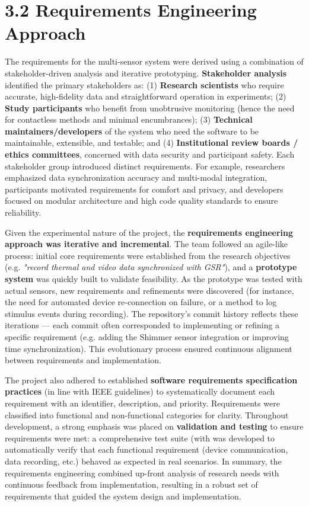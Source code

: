 \documentclass[11pt,a4paper]{report}
\begin{document}
\section{3.2 Requirements Engineering Approach}

The requirements for the multi-sensor system were derived using a
combination of stakeholder-driven analysis and iterative prototyping.
\textbf{Stakeholder analysis} identified the primary stakeholders as: (1)
\textbf{Research scientists} who require accurate, high-fidelity data and
straightforward operation in experiments; (2) \textbf{Study participants} who
benefit from unobtrusive monitoring (hence the need for contactless
methods and minimal encumbrances); (3) \textbf{Technical
maintainers/developers} of the system who need the software to be
maintainable, extensible, and testable; and (4) \textbf{Institutional review
boards / ethics committees}, concerned with data security and
participant safety. Each stakeholder group introduced distinct
requirements. For example, researchers emphasized data synchronization
accuracy and multi-modal integration, participants motivated
requirements for comfort and privacy, and developers focused on modular
architecture and high code quality standards to ensure reliability.

Given the experimental nature of the project, the \textbf{requirements
engineering approach was iterative and incremental}. The team followed
an agile-like process: initial core requirements were established from
the research objectives (e.g. \textit{"record thermal and video data
synchronized with GSR"}), and a \textbf{prototype system} was quickly built
to validate feasibility. As the prototype was tested with actual
sensors, new requirements and refinements were discovered (for instance,
the need for automated device re-connection on failure, or a method to
log stimulus events during recording). The repository's commit history
reflects these iterations --- each commit often corresponded to
implementing or refining a specific requirement (e.g. adding the Shimmer
sensor integration or improving time synchronization). This evolutionary
process ensured continuous alignment between requirements and
implementation.

The project also adhered to established \textbf{software requirements
specification practices} (in line with IEEE guidelines) to
systematically document each requirement with an identifier,
description, and priority. Requirements were classified into functional
and non-functional categories for clarity. Throughout development, a
strong emphasis was placed on \textbf{validation and testing} to ensure
requirements were met: a comprehensive test suite (with %
was developed to automatically verify that each functional requirement
(device communication, data recording, etc.) behaved as expected in real
scenarios. In summary, the requirements engineering combined up-front
analysis of research needs with continuous feedback from implementation,
resulting in a robust set of requirements that guided the system design
and implementation.
\end{document}
